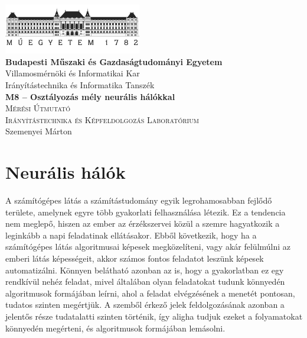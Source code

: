 \documentclass[12pt,a4paper,oneside]{report}             %
\author{\vikauthor}
\title{\viktitle}
\newcommand{\vikauthor}{Szemenyei Márton}
\newcommand{\viktitle}{M8 – Osztályozás mély neurális hálókkal}
\newcommand{\vikdept}{Irányítástechnika és Informatika Tanszék}
\newcommand{\vikdoktipus}{Irányítástechnika és Képfeldolgozás Laboratórium}
\newcommand{\viksubtitle}{Mérési Útmutató}
\newcommand{\hsp}{\hspace{20pt}}
\begin{document}
\onehalfspacing

\begin{titlepage}
\begin{center}
\includegraphics[width=60mm,keepaspectratio]{images/logo.png}\\
\vspace{0.3cm}
\textbf{Budapesti Műszaki és Gazdaságtudományi Egyetem}\\
\textmd{Villamosmérnöki és Informatikai Kar}\\
\textmd{\vikdept}\\[5cm]

\vspace{0.4cm}
{\huge \bfseries \viktitle}\\[2cm]
\textsc{\Large \viksubtitle}\\[1cm]
\textsc{\Large \vikdoktipus}\\[6cm]

\vfill
{\large \vikauthor}
\end{center}
\end{titlepage}


\singlespacing
\tableofcontents\thispagestyle{fancy}
\titleformat{\chapter}[hang]{\Huge\bfseries}{\thechapter\hsp}{0pt}{\Huge\bfseries}

\chapter{Neurális hálók}

A számítógépes látás a számítástudomány egyik legrohamosabban fejlődő területe, amelynek egyre több gyakorlati felhasználása létezik. Ez a tendencia nem meglepő, hiszen az ember az érzékszervei közül a szemre hagyatkozik a leginkább a napi feladatinak ellátásakor. Ebből következik, hogy ha a számítógépes látás algoritmusai képesek megközelíteni, vagy akár felülmúlni az emberi látás képességeit, akkor számos fontos feladatot leszünk képesek automatizálni. Könnyen belátható azonban az is, hogy a gyakorlatban ez egy rendkívül nehéz feladat, mivel általában olyan feladatokat tudunk könnyedén algoritmusok formájában leírni, ahol a feladat elvégzésének a menetét pontosan, tudatos szinten megértjük. A szemből érkező jelek feldolgozásának azonban a jelentős része tudatalatti szinten történik, így aligha tudjuk ezeket a folyamatokat könnyedén megérteni, és algoritmusok formájában lemásolni.
\end{document}
